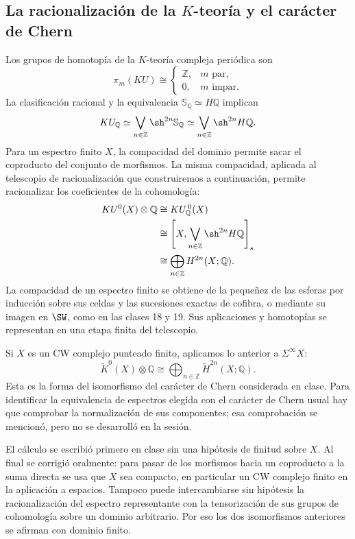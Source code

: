 \subsection{La racionalización de la \texorpdfstring{$K$}{K}-teoría y el carácter de Chern}
Los grupos de homotopía de la $K$-teoría compleja periódica son
\[
\pi_m(KU)\cong
\begin{cases}
\mathbb Z,&m\text{ par},\\
0,&m\text{ impar}.
\end{cases}
\]
La clasificación racional y la equivalencia $\mathbb S_{\mathbb Q}\simeq H\mathbb Q$ implican
\[
KU_{\mathbb Q}\simeq\bigvee_{n\in\mathbb Z}\sh^{2n}\mathbb S_{\mathbb Q}
\simeq\bigvee_{n\in\mathbb Z}\sh^{2n}H\mathbb Q.
\]
Para un espectro finito $X$, la compacidad del dominio permite sacar el coproducto del conjunto de morfismos. La misma compacidad, aplicada al telescopio de racionalización que construiremos a continuación, permite racionalizar los coeficientes de la cohomología:
\[
\begin{aligned}
KU^0(X)\otimes\mathbb Q
&\cong KU_{\mathbb Q}^{\,0}(X)\\
&\cong\left[X,\bigvee_{n\in\mathbb Z}\sh^{2n}H\mathbb Q\right]_s\\
&\cong\bigoplus_{n\in\mathbb Z}H^{2n}(X;\mathbb Q).
\end{aligned}
\]
La compacidad de un espectro finito se obtiene de la pequeñez de las esferas por inducción sobre sus celdas y las sucesiones exactas de cofibra, o mediante su imagen en $\SW$, como en las clases 18 y 19. Sus aplicaciones y homotopías se representan en una etapa finita del telescopio.

Si $X$ es un CW complejo punteado finito, aplicamos lo anterior a $\Sigma^\infty X$:
\[
\widetilde K^0(X)\otimes\mathbb Q
\cong\bigoplus_{n\in\mathbb Z}\widetilde H^{2n}(X;\mathbb Q).
\]
Esta es la forma del isomorfismo del carácter de Chern considerada en clase. Para identificar la equivalencia de espectros elegida con el carácter de Chern usual hay que comprobar la normalización de sus componentes; esa comprobación se mencionó, pero no se desarrolló en la sesión.

\begin{nota}
El cálculo se escribió primero en clase sin una hipótesis de finitud sobre $X$. Al final se corrigió oralmente: para pasar de los morfismos hacia un coproducto a la suma directa se usa que $X$ sea compacto, en particular un CW complejo finito en la aplicación a espacios. Tampoco puede intercambiarse sin hipótesis la racionalización del espectro representante con la tensorización de sus grupos de cohomología sobre un dominio arbitrario. Por eso los dos isomorfismos anteriores se afirman con dominio finito.
\end{nota}

